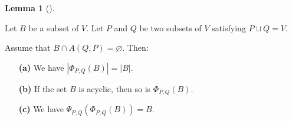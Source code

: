 \documentclass[numbers=enddot,12pt,final,onecolumn,notitlepage]{scrartcl}%
\theoremstyle{definition}
\newtheorem{lem}[theo]{Lemma}
\newenvironment{lemma}[1][]
{\begin{lem}[#1]\begin{leftbar}}
{\end{leftbar}\end{lem}}
\theoremstyle{plainsl}
\begin{document}
\begin{lemma}
\label{lem.realignment-acyc}Let $B$ be a subset of $V$. Let $P$ and $Q$ be two
subsets of $V$ satisfying $P\sqcup Q=V$.

Assume that $B\cap A\left(  Q,P\right)  =\varnothing$. Then:

\begin{enumerate}
\item[\textbf{(a)}] We have $\left\vert \Phi_{P,Q}\left(  B\right)
\right\vert =\left\vert B\right\vert $.

\item[\textbf{(b)}] If the set $B$ is acyclic, then so is $\Phi_{P,Q}\left(
B\right)  $.

\item[\textbf{(c)}] We have $\Psi_{P,Q}\left(  \Phi_{P,Q}\left(  B\right)
\right)  =B$.
\end{enumerate}
\end{lemma}
\end{document}
